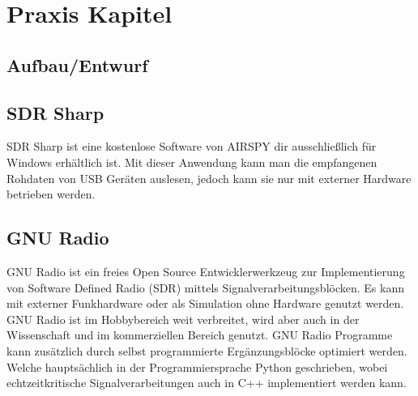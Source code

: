 
\chapter{Praxis Kapitel}
\section{Aufbau/Entwurf}
\section{SDR Sharp}
SDR Sharp ist eine kostenlose Software von AIRSPY dir ausschließlich für Windows erhältlich ist. Mit dieser Anwendung kann man die empfangenen Rohdaten von USB Geräten auslesen, jedoch kann sie nur mit externer Hardware betrieben werden.  
\section{GNU Radio}
GNU  Radio  ist  ein  freies  Open  Source  Entwicklerwerkzeug  zur  Implementierung von Software Defined Radio (SDR) mittels Signalverarbeitungsblöcken. Es kann mit externer Funkhardware oder als Simulation ohne Hardware genutzt werden. GNU Radio ist im Hobbybereich weit verbreitet, wird aber auch in der Wissenschaft und im kommerziellen Bereich genutzt. GNU Radio Programme kann zusätzlich  durch selbst programmierte Ergänzungsblöcke optimiert werden. Welche hauptsächlich in der Programmiersprache Python geschrieben, wobei echtzeitkritische Signalverarbeitungen auch in C++ implementiert werden kann.
